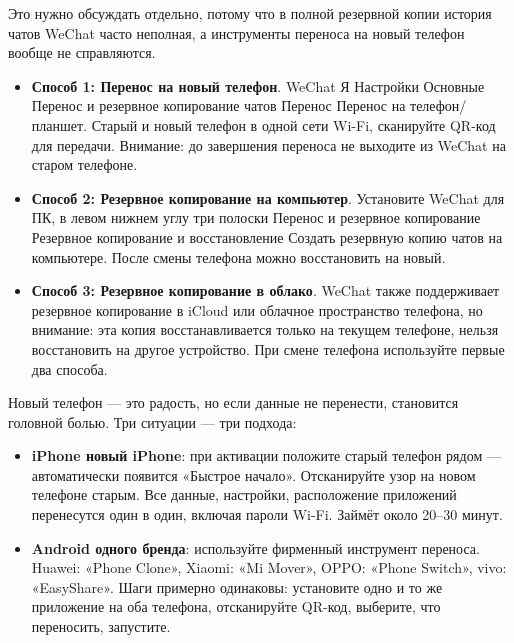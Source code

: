 
Это нужно обсуждать отдельно, потому что в полной резервной копии история чатов WeChat часто неполная, а инструменты переноса на новый телефон вообще не справляются.

\begin{itemize}
  \item \textbf{Способ 1: Перенос на новый телефон}. WeChat Я Настройки Основные Перенос и резервное копирование чатов Перенос Перенос на телефон/планшет. Старый и новый телефон в одной сети Wi-Fi, сканируйте QR-код для передачи. Внимание: до завершения переноса не выходите из WeChat на старом телефоне.
  \item \textbf{Способ 2: Резервное копирование на компьютер}. Установите WeChat для ПК, в левом нижнем углу три полоски Перенос и резервное копирование Резервное копирование и восстановление Создать резервную копию чатов на компьютере. После смены телефона можно восстановить на новый.
  \item \textbf{Способ 3: Резервное копирование в облако}. WeChat также поддерживает резервное копирование в iCloud или облачное пространство телефона, но внимание: эта копия восстанавливается только на текущем телефоне, нельзя восстановить на другое устройство. При смене телефона используйте первые два способа.
\end{itemize}


Новый телефон — это радость, но если данные не перенести, становится головной болью. Три ситуации — три подхода:


\begin{itemize}
  \item \textbf{iPhone новый iPhone}: при активации положите старый телефон рядом — автоматически появится «Быстрое начало». Отсканируйте узор на новом телефоне старым. Все данные, настройки, расположение приложений перенесутся один в один, включая пароли Wi-Fi. Займёт около 20–30 минут.
  \item \textbf{Android одного бренда}: используйте фирменный инструмент переноса. Huawei: «Phone Clone», Xiaomi: «Mi Mover», OPPO: «Phone Switch», vivo: «EasyShare». Шаги примерно одинаковы: установите одно и то же приложение на оба телефона, отсканируйте QR-код, выберите, что переносить, запустите.
\end{itemize}

